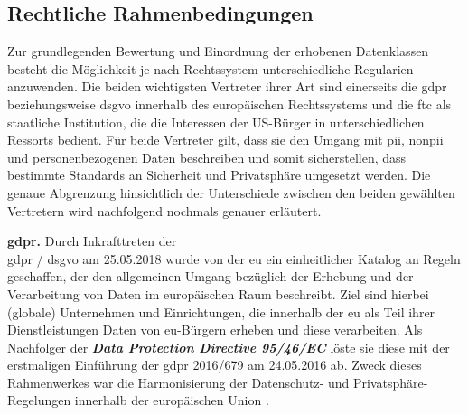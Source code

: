 \subsection{Rechtliche Rahmenbedingungen}
\label{sec:Grundlagen:ssec:Rechtliche Rahmenbedingungen}
Zur grundlegenden Bewertung und Einordnung der erhobenen Datenklassen besteht die Möglichkeit je nach Rechtssystem unterschiedliche Regularien anzuwenden. Die beiden wichtigsten Vertreter ihrer Art sind einerseits die \acl{gdpr} beziehungsweise \acl{dsgvo} innerhalb des europäischen Rechtssystems und die \acl{ftc} als staatliche Institution, die die Interessen der US-Bürger in unterschiedlichen Ressorts bedient. Für beide Vertreter gilt, dass sie den Umgang mit \ac{pii}, \ac{nonpii} und personenbezogenen Daten beschreiben und somit sicherstellen, dass bestimmte Standards an Sicherheit und Privatsphäre umgesetzt werden. Die genaue Abgrenzung hinsichtlich der Unterschiede zwischen den beiden gewählten Vertretern wird nachfolgend nochmals genauer erläutert.


\noindent \textbf{\acl{gdpr}.}
Durch Inkrafttreten der \\ \ac{gdpr} / \ac{dsgvo} am 25.05.2018 wurde von der \acl{eu} ein einheitlicher Katalog an Regeln geschaffen, der den allgemeinen Umgang bezüglich der Erhebung und der Verarbeitung von Daten im europäischen Raum beschreibt. Ziel sind hierbei (globale) Unternehmen und Einrichtungen, die innerhalb der \acl{eu} als Teil ihrer Dienstleistungen Daten von \ac{eu}-Bürgern erheben und diese verarbeiten. Als Nachfolger der \textbf{\textit{Data Protection Directive 95/46/EC}} löste sie diese mit der erstmaligen Einführung der \ac{gdpr} 2016/679 am 24.05.2016 ab. Zweck dieses Rahmenwerkes war die Harmonisierung der Datenschutz- und Privatsphäre-Regelungen innerhalb der europäischen Union \cite{Bastos2019}.

